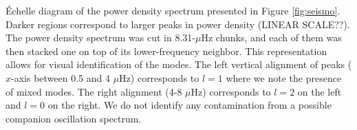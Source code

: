 \label{fig:echelle} \'Echelle diagram of the power density spectrum presented in Figure \ref{fig:seismo}. Darker regions correspond to larger peaks in power density (LINEAR SCALE??). The power density spectrum was cut in 8.31-$\mu$Hz chunks, and each of them was then stacked one on top of its lower-frequency neighbor. This representation allows for visual identification of the modes. The left vertical alignment of peaks ($x$-axis between 0.5 and 4 $\mu$Hz) corresponds to $l=1$ where we note the presence of mixed modes. The right alignment (4-8 $\mu$Hz) corresponds to $l=2$ on the left and $l=0$ on the right. We do not identify any contamination from a possible companion oscillation spectrum.
